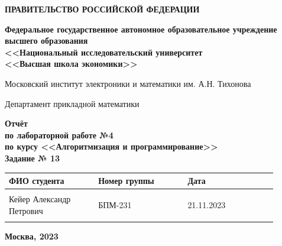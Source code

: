 \documentclass[12pt]{article}
\begin{document}
	
	\thispagestyle{empty}
	\begin{center}
		\textbf{ПРАВИТЕЛЬСТВО РОССИЙСКОЙ ФЕДЕРАЦИИ}
		
		\vspace{5ex}
		
		\textbf{Федеральное государственное автономное образовательное учреждение \\ высшего образования \\ <<Национальный исследовательский университет \\ <<Высшая школа экономики>>}
	\end{center}
	\vspace{5ex}
	
	\begin{center}
		Московский институт электроники и математики им. А.Н. Тихонова  
		
		\vspace{5ex}
		
		Департамент прикладной математики
		
		\vspace{10ex}
		\textbf{Отчёт \\ по лабораторной работе №4 \\ по курсу <<Алгоритмизация и программирование>> \\ Задание № 13}
		\vspace{7ex}
		
	\end{center}
	
	\begin{center} 
		\begin{tabular}{| p{0.3\linewidth}| p{0.3\linewidth}| p{0.3\linewidth}|}
			\hline	
			ФИО студента & Номер группы & Дата \\  \hline
			& & \\  
			Кейер Александр \newline Петрович & БПМ-231 & 21.11.2023\\  
			& & \\  \hline		
		\end{tabular}
	\end{center}
	
	\begin{center}
		\vspace{3ex}
		
		\vfill
		
		\normalsize
		
		\textbf{Москва, 2023}
	\end{center}
	
\end{document}
